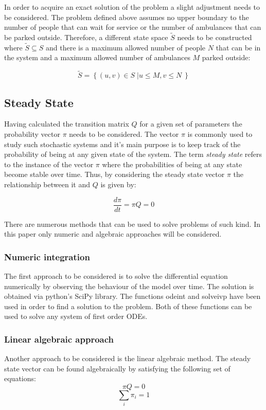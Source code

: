 \documentclass{article}
\begin{document}
In order to acquire an exact solution of the problem a slight adjustment needs to be considered. The problem defined above assumes no upper boundary to the number of people that can wait for service or the number of ambulances that can be parked outside. Therefore, a different state space \( \tilde S \) needs to be constructed where \( \tilde S \subseteq S \) and there is a maximum allowed number of people \( N \) that can be in the system and a maximum allowed number of ambulances \( M \) parked outside:

\begin{equation}
    \tilde S = \left\{ (u, v) \in S\;| u \leq M, v\leq N\ \right\}
\end{equation}


\subsection{Steady State}
Having calculated the transition matrix \( Q \) for a given set of parameters the probability vector \( \pi \) needs to be considered. The vector \( \pi \) is commonly used to study such stochastic systems and it's main purpose is to keep track of the probability of being at any given state of the system. The term \textit{steady state} refers to the instance of the vector \( \pi \) where the probabilities of being at any state become stable over time. Thus, by considering the steady state vector \( \pi \) the relationship between it and \(Q \) is given by:

\[
\frac{d\pi}{dt} = \pi Q = 0
\]

There are numerous methods that can be used to solve problems of such kind. In this paper only numeric and algebraic approaches will be considered. 

\subsubsection{Numeric integration}
The first approach to be considered is to solve the differential equation numerically by observing the behaviour of the model over time. The solution is obtained via python's SciPy library. The functions odeint and solve\textunderscore ivp have been used in order to find a solution to the problem. Both of these functions can be used to solve any system of first order ODEs.

\subsubsection{Linear algebraic approach}
Another approach to be considered is the linear algebraic method. The steady state vector can be found algebraically by satisfying the following set of equations:
\[ \pi Q = 0 \]
\[ \sum_{i} \pi_i = 1 \]
\end{document}
